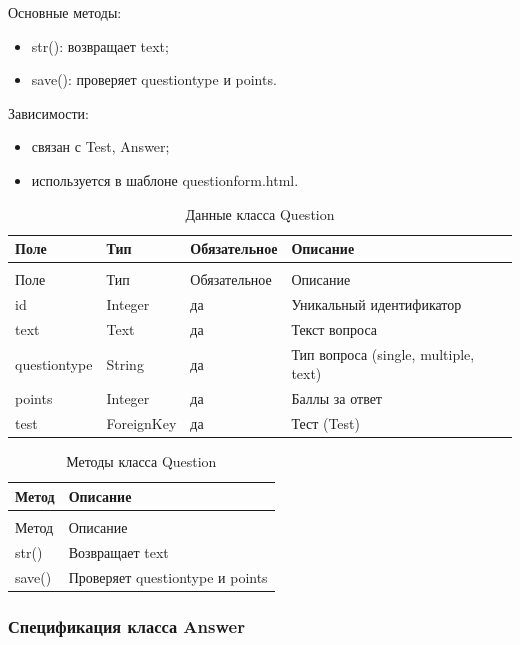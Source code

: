 Основные методы:
	\begin{itemize}
		\item str(): возвращает text;
		\item save(): проверяет questiontype и points.
	\end{itemize}
	
Зависимости:
	\begin{itemize}
		\item связан с Test, Answer;
		\item используется в шаблоне questionform.html.
	\end{itemize}


\begin{xltabular}{\textwidth}{|l|l|l|X|}
	\caption{Данные класса Question\label{tab:question_attributes}}\\
	\hline
	Поле & Тип & Обязательное & Описание \\ \hline
	\endfirsthead
	\\
	\hline
	Поле & Тип & Обязательное & Описание \\ \hline
	\endhead
	id & Integer & да & Уникальный идентификатор \\ \hline
	text & Text & да & Текст вопроса \\ \hline
	questiontype & String & да & Тип вопроса (single, multiple, text) \\ \hline
	points & Integer & да & Баллы за ответ \\ \hline
	test & ForeignKey & да & Тест (Test) \\ \hline
\end{xltabular}

\begin{xltabular}{\textwidth}{|l|X|}
	\caption{Методы класса Question\label{tab:question_methods}}\\
	\hline
	Метод & Описание \\ \hline
	\endfirsthead
	\\
	\hline
	Метод & Описание \\ \hline
	\endhead
	str() & Возвращает text \\ \hline
	save() & Проверяет questiontype и points \\ \hline
\end{xltabular}

\subsubsection{Спецификация класса Answer}

